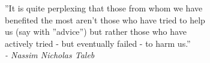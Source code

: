 \begin{flushright}
''It is quite perplexing that those from whom we have\\
benefited the most aren’t those who have tried to help\\
us (say with ''advice'') but rather those who have\\
actively tried - but eventually failed - to harm us.''\\

\textit{- Nassim Nicholas Taleb}
\end{flushright}